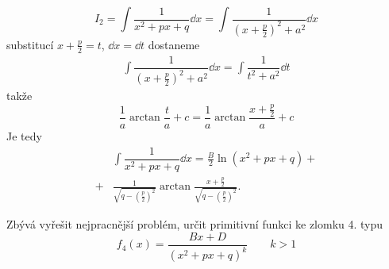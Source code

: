       \begin{equation}
        I_2 =\int\dfrac{1}{x^2+px+q}\dd{x} 
            =\int{\dfrac{1}{\left(x+\frac{p}{2}\right)^2 + a^2}}\dd{x}
      \end{equation}
      substitucí \(x + \frac{p}{2} = t\), \(\dd{x} = \dd{t}\) dostaneme 
      \begin{gather*}
        \int{\dfrac{1}{\left(x+\frac{p}{2}\right)^2 + a^2}}\dd{x} = 
        \int{\dfrac{1}{t^2+a^2}}\dd{t}
      \end{gather*}
      takže
      \begin{equation*}
        \dfrac{1}{a}\arctan\dfrac{t}{a} + c = \dfrac{1}{a}\arctan\dfrac{x + \frac{p}{2}}{a} + c 
      \end{equation*}
      Je tedy
      \begin{align}
          &\int\dfrac{1}{x^2+px+q}\dd{x} = \frac{B}{2}\ln(x^2+px+q) +              \nonumber     \\ 
        + &\frac{1}{\sqrt{q-\left(\frac{p}{2}\right)^2}}
                \arctan\frac{x+\frac{p}{2}}{\sqrt{q-\left(\frac{p}{2}\right)^2}}.  \label{mai:eq171}
      \end{align}
     
      

      Zbývá vyřešit nejpracnější problém, určit primitivní funkci ke zlomku 4. typu
      \begin{equation}\label{mai:eq172}
        \boxed{f_4(x) = \frac{Bx + D}{(x^2+px+q)^k}} \qquad k>1
      \end{equation}      
      
